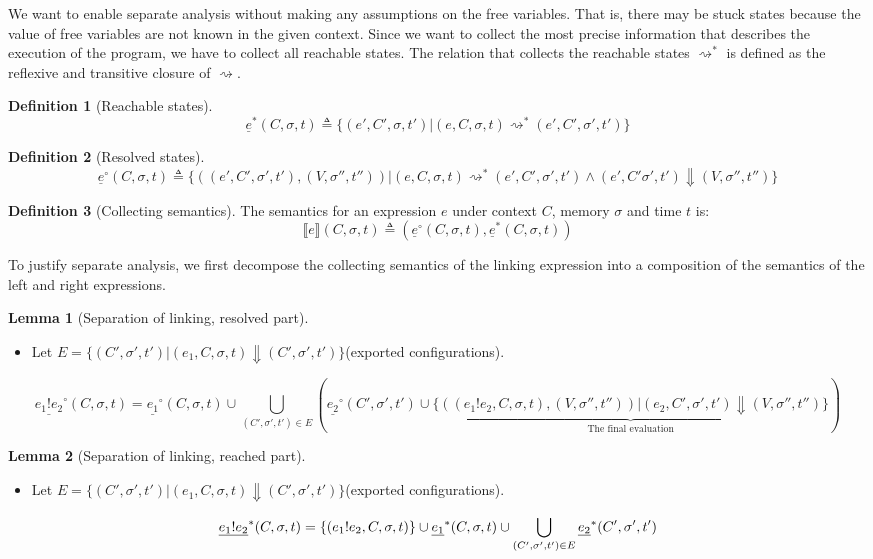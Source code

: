\documentclass{article}
\theoremstyle{definition}
\newtheorem{definition}{Definition}[section]
\newtheorem{lem}{Lemma}[section]
\newcommand*{\link}[2]{{#1}\mathtt{!}{#2}}
\newcommand*{\Reach}[1]{\underline{#1}^{*}}
\newcommand*{\Resolved}[1]{\underline{#1}^{\circ}}
\newcommand*{\sembracket}[1]{\lBrack{#1}\rBrack}
\begin{document}
We want to enable separate analysis without making any assumptions on the free variables.
That is, there may be stuck states because the value of free variables are not known in the given context.
Since we want to collect the most precise information that describes the execution of the program, we have to collect all reachable states.
The relation that collects the reachable states $\rightsquigarrow^{*}$ is defined as the reflexive and transitive closure of $\rightsquigarrow$.

\begin{definition}[Reachable states]
  \[
    \Reach{e}(C,\sigma,t)\triangleq\{(e',C',\sigma,t')| (e,C,\sigma,t)\rightsquigarrow^{*}(e',C',\sigma',t')\}
  \]
\end{definition}

\begin{definition}[Resolved states]
  \[
    \Resolved{e}(C,\sigma,t)\triangleq\{((e',C',\sigma',t'),(V,\sigma'',t''))|(e,C,\sigma,t)\rightsquigarrow^{*}(e',C',\sigma',t')\wedge(e',C'\sigma',t')\Downarrow(V,\sigma'',t'')\}
  \]
\end{definition}

\begin{definition}[Collecting semantics]
  The semantics for an expression $e$ under context $C$, memory $\sigma$ and time $t$ is:
  \[
    \sembracket{e}(C,\sigma,t)\triangleq(\Resolved{e}(C,\sigma,t),\Reach{e}(C,\sigma,t))
  \]
\end{definition}

To justify separate analysis, we first decompose the collecting semantics of the linking expression into a composition of the semantics of the left and right expressions.
\begin{lem}[Separation of linking, resolved part]
  $\:$

  \begin{itemize}
    \item Let $E=\{(C',\sigma',t')|(e_{1},C,\sigma,t)\Downarrow(C',\sigma',t')\}$(exported configurations).
  \end{itemize}
  \[
    \Resolved{\link{e_1}{e_2}}(C,\sigma,t)=
    \Resolved{e_1}(C,\sigma,t)\cup\bigcup_{(C',\sigma',t')\in E}{(\Resolved{e_2}(C',\sigma',t')\cup\underbrace{\{((\link{e_1}{e_2}, C, \sigma, t), (V,\sigma'',t''))|(e_{2},C',\sigma',t')\Downarrow(V,\sigma'',t'')\}}_{\text{The final evaluation}})}
  \]
\end{lem}

\begin{lem}[Separation of linking, reached part]
  $\:$

  \begin{itemize}
    \item Let $E=\{(C',\sigma',t')|(e_{1},C,\sigma,t)\Downarrow(C',\sigma',t')\}$(exported configurations).
  \end{itemize}
  \[
    \Reach{\link{e_1}{e_2}}(C,\sigma,t)= \{(\link{e_1}{e_2},C,\sigma,t)\}\cup\Reach{e_1}(C,\sigma,t)\cup\bigcup_{(C',\sigma',t')\in E}{\Reach{e_2}(C',\sigma',t')}                                                                                                                                         \\
  \]
\end{lem}
\end{document}
